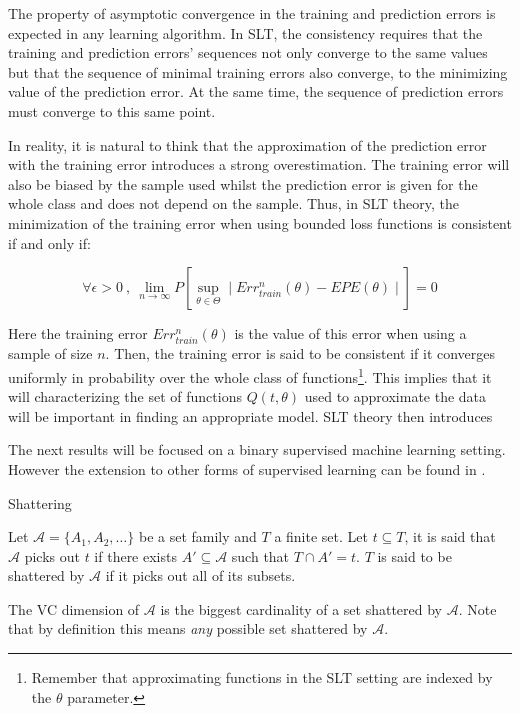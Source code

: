 The property of asymptotic convergence in the training and prediction errors is expected in any learning algorithm. In SLT, the consistency requires that the training and prediction errors'  sequences not only converge to the same values but that the sequence of minimal training errors also converge, to the minimizing value of the prediction error. At the same time, the sequence of prediction errors must converge to this same point. 

In reality, it is natural to think that the approximation of the prediction error with the training error introduces a strong overestimation. The training error will also be biased by the sample used whilst the prediction error is given for the whole class and does not depend on the sample. Thus, in SLT theory, the minimization of the training error when using bounded loss functions is consistent if and only if:

		
$$\forall \epsilon > 0 \ , \ \lim_{n\to\infty} P\left[ \sup_{\theta \in \Theta} \mid Err^{n}_{train}(\theta)  - EPE(\theta) \mid \right]  = 0 $$  %


	Here the training error $Err^{n}_{train}(\theta)$ is the value of this error when using a sample of size $n$. Then, the training error is said to be consistent if it converges uniformly in probability over the whole class of functions\footnote{Remember that approximating functions in the SLT setting are indexed by the $\theta$ parameter.}. This implies that it will characterizing the set of functions $Q(t,\theta)$ used to approximate the data will be important in finding an appropriate model. SLT theory then introduces 
	
	The next results will be focused on a binary supervised machine learning setting. However the extension to other forms of supervised learning can be found in \cite{cherkassky-learning2007}. 

\begin{definition}{Shattering}
	
	Let $\mathcal {A}= \{A_1,A_{2},\dots \}$ be a set family and $T$ a finite set. Let $t \subseteq T$, it is said that $\mathcal {A}$ picks out $t$ if there exists $A' \subseteq \mathcal {A} $ such that $ T \cap A' = t$. $T$ is said to be shattered by $\mathcal {A}$ if it picks out all of its subsets.
	
	The VC dimension of $\mathcal {A}$ is the biggest cardinality of a set shattered by $\mathcal {A}$. Note that by definition this means \textit{any} possible set shattered by $\mathcal {A}$.

\end{definition}

